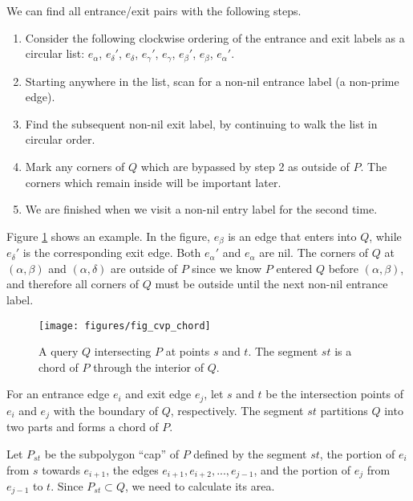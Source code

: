 We can find all entrance/exit pairs with the following steps.
\begin{enumerate}
 \item Consider the following clockwise ordering of the entrance and exit labels as a circular list: $e_\alpha$, $e_\delta'$, $e_\delta$, $e_\gamma'$, $e_\gamma$, $e_\beta'$, $e_\beta$, $e_\alpha'$.
 
 \item Starting anywhere in the list, scan for a non-nil entrance label (a non-prime edge).
 
 \item Find the subsequent non-nil exit label, by continuing to walk the list in circular order.
 
 \item Mark any corners of $Q$ which are bypassed by step 2 as outside of $P$. The corners which remain inside will be important later.
 
 \item We are finished when we visit a non-nil entry label for the second time.
\end{enumerate}

Figure \ref{fig:convexp:chord} shows an example. In the figure, $e_\beta$ is an edge that enters into $Q$, while $e_\delta'$ is the corresponding exit edge. Both $e_\alpha'$ and $e_\alpha$ are nil. The corners of $Q$ at $(\alpha, \beta)$ and $(\alpha, \delta)$ are outside of $P$ since we know $P$ entered $Q$ before $(\alpha, \beta)$, and therefore all corners of $Q$ must be outside until the next non-nil entrance label.

\begin{figure}[t]
\begin{center}
  \texttt{[image: figures/fig\_cvp\_chord]}
  \caption[A query $Q$ intersecting $P$ at points $s$ and $t$.]{A query $Q$ intersecting $P$ at points $s$ and $t$. The segment $st$ is a chord of $P$ through the interior of $Q$.}
  \label{fig:convexp:chord}
\end{center}
\end{figure}

For an entrance edge $e_i$ and exit edge $e_j$, let $s$ and $t$ be the intersection points of $e_i$ and $e_j$ with the boundary of $Q$, respectively. 
The segment $st$ partitions $Q$ into two parts and forms a chord of $P$.

Let $P_{st}$ be the subpolygon ``cap'' of $P$ defined by the segment $st$, the portion of $e_i$ from $s$ towards $e_{i+1}$, the edges $e_{i+1}, e_{i+2}, ..., e_{j-1}$, and the portion of $e_j$ from $e_{j-1}$ to $t$.
Since $P_{st} \subset Q$, we need to calculate its area.

